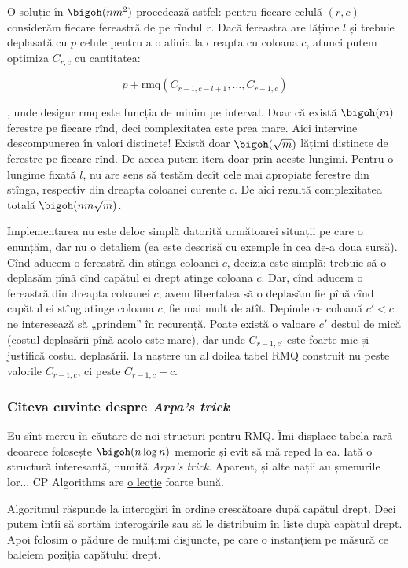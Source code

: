 O soluție în $\bigoh(nm^2)$ procedează astfel: pentru fiecare celulă $(r,c)$ considerăm fiecare fereastră de pe rîndul $r$. Dacă fereastra are lățime $l$ și trebuie deplasată cu $p$ celule pentru a o alinia la dreapta cu coloana $c$, atunci putem optimiza $C_{r,c}$ cu cantitatea:

$$p + \textrm{rmq}(C_{r-1,c-l+1}, \dots, C_{r-1,c})$$

, unde desigur $\textrm{rmq}$ este funcția de minim pe interval. Doar că există $\bigoh(m)$ ferestre pe fiecare rînd, deci complexitatea este prea mare. Aici intervine descompunerea în valori distincte! Există doar $\bigoh(\sqrt{m})$ lățimi distincte de ferestre pe fiecare rînd. De aceea putem itera doar prin aceste lungimi. Pentru o lungime fixată $l$, nu are sens să testăm decît cele mai apropiate ferestre din stînga, respectiv din dreapta coloanei curente $c$. De aici rezultă complexitatea totală $\bigoh(nm \sqrt{m})$.

Implementarea nu este deloc simplă datorită următoarei situații pe care o enunțăm, dar nu o detaliem (ea este descrisă cu exemple în cea de-a doua sursă). Cînd aducem o fereastră din stînga coloanei $c$, decizia este simplă: trebuie să o deplasăm pînă cînd capătul ei drept atinge coloana $c$. Dar, cînd aducem o fereastră din dreapta coloanei $c$, avem libertatea să o deplasăm fie pînă cînd capătul ei stîng atinge coloana $c$, fie mai mult de atît. Depinde ce coloană $c' < c$ ne interesează să „prindem” în recurență. Poate există o  valoare $c'$ destul de mică (costul deplasării pînă acolo este mare), dar unde $C_{r-1,c'}$ este foarte mic și justifică costul deplasării. Ia naștere un al doilea tabel RMQ construit nu peste valorile $C_{r-1,c}$, ci peste $C_{r-1,c} - c$.

\subsubsection*{Cîteva cuvinte despre \textit{Arpa's trick}}

Eu sînt mereu în căutare de noi structuri pentru RMQ.  Îmi displace tabela rară deoarece folosește  $\bigoh(n \log n)$ memorie și evit să mă reped la ea. Iată o structură interesantă, numită \textit{Arpa's trick}. Aparent, și alte nații au șmenurile lor... CP Algorithms are \href{https://cp-algorithms.com/data_structures/disjoint_set_union.html#arpa}{o lecție} foarte bună.

Algoritmul răspunde la interogări în ordine crescătoare după capătul drept. Deci putem întîi să sortăm interogările sau să le distribuim în liste după capătul drept.  Apoi folosim o pădure de mulțimi disjuncte, pe care o instanțiem pe măsură ce baleiem poziția capătului drept.

